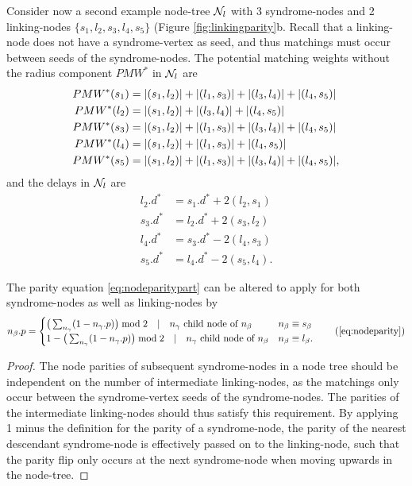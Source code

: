 Consider now a second example node-tree $\mathcal{N}_l$ with 3 syndrome-nodes and 2 linking-nodes $\{s_1, l_2, s_3, l_4, s_5\}$ (Figure \ref{fig:linkingparity}b. Recall that a linking-node does not have a syndrome-vertex as seed, and thus matchings must occur between seeds of the syndrome-nodes. The potential matching weights without the radius component $PMW^*$ in $\mathcal{N}_l$ are
\begin{align*}
  PMW^*(s_1) &= \abs{(s_1, l_2)} + \abs{(l_1, s_3)} + \abs{(l_3, l_4)} + \abs{(l_4, s_5)} \\
  PMW^*(l_2) &= \abs{(s_1, l_2)} + \abs{(l_3, l_4)} + \abs{(l_4, s_5)} \\
  PMW^*(s_3) &= \abs{(s_1, l_2)} + \abs{(l_1, s_3)} + \abs{(l_3, l_4)} + \abs{(l_4, s_5)} \\
  PMW^*(l_4) &= \abs{(s_1, l_2)} + \abs{(l_1, s_3)} + \abs{(l_4, s_5)} \\
  PMW^*(s_5) &= \abs{(s_1, l_2)} + \abs{(l_1, s_3)} + \abs{(l_3, l_4)} + \abs{(l_4, s_5)},
\end{align*}
and the delays in $\mathcal{N}_l$ are 
\begin{align*}
  l_2.d^* &= s_1.d^* + 2(l_2, s_1)\\
  s_3.d^* &= l_2.d^* + 2(s_3, l_2)\\
  l_4.d^* &= s_3.d^* - 2(l_4, s_3)\\
  s_5.d^* &= l_4.d^* - 2(s_5, l_4).
\end{align*}

\begin{lemma}\label{lem:nodeparity}
  The parity equation \eqref{eq:nodeparitypart} can be altered to apply for both syndrome-nodes as well as linking-nodes by   
  \begin{equation}
    n_\beta.p =
    \begin{cases}
      \big( \sum_{n_\gamma} (1-n_\gamma.p) \big ) \bmod 2 \hspace{1em} | \hspace{1em} n_\gamma \text{ child node of } n_\beta & n_\beta \equiv s_\beta \\
      1 - \big( \sum_{n_\gamma} (1-n_\gamma.p) \big ) \bmod 2 \hspace{1em} | \hspace{1em} n_\gamma \text{ child node of } n_\beta & n_\beta \equiv l_\beta.
    \end{cases}\tag{\ref{eq:nodeparity}}
  \end{equation}
\end{lemma}
\begin{proof}
  The node parities of subsequent syndrome-nodes in a node tree should be independent on the number of intermediate linking-nodes, as the matchings only occur between the syndrome-vertex seeds of the syndrome-nodes. The parities of the intermediate linking-nodes should thus satisfy this requirement. By applying 1 minus the definition for the parity of a syndrome-node, the parity of the nearest descendant syndrome-node is effectively passed on to the linking-node, such that the parity flip only occurs at the next syndrome-node when moving upwards in the node-tree. 
\end{proof}

